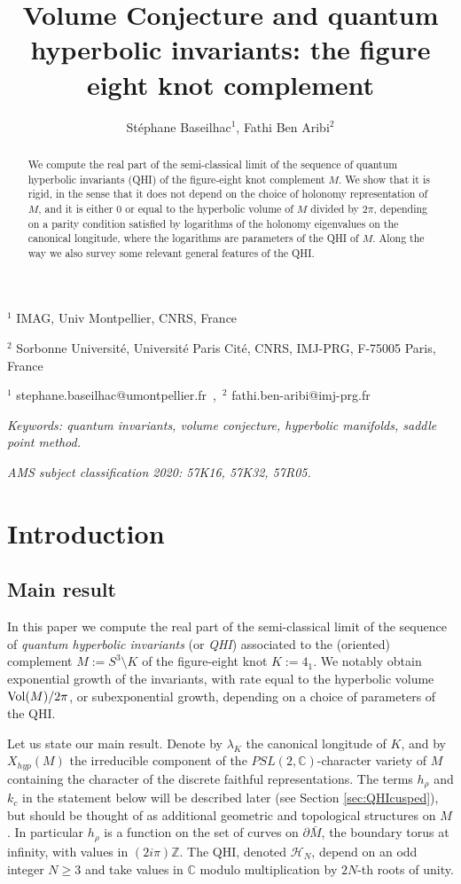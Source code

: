 \documentclass[11pt]{amsart}
\title[Volume Conjecture and quantum hyperbolic invariants]
{Volume Conjecture and quantum hyperbolic invariants: the figure eight knot complement}
\author{St\'ephane Baseilhac$^1$, Fathi Ben Aribi$^{2}$}
\newcommand{\mc}{\mathbb{C}}
\newcommand{\mz}{\mathbb{Z}}
\newcommand{\Hh}{{\mathcal H}}
\begin{document}
\maketitle

\centerline{${}^1$ IMAG, Univ Montpellier, CNRS, France}
\centerline{${}^2$ Sorbonne Université, Université Paris Cité, CNRS, IMJ-PRG, F-75005 Paris, France}
\medskip \centerline{${}^1$ stephane.baseilhac@umontpellier.fr\ ,\ ${}^2$ fathi.ben-aribi@imj-prg.fr}


\begin{abstract} We compute the real part of the semi-classical limit of the sequence of quantum hyperbolic invariants (QHI) of the figure-eight knot complement $M$. We show that  it is rigid, in the sense that it does not depend on the choice of holonomy representation of $M$, and it is either $0$ or equal to the hyperbolic volume of $M$ divided by $2\pi$, depending on a parity condition satisfied by logarithms of the holonomy eigenvalues on the canonical longitude, where the logarithms are parameters of the QHI of $M$. Along the way we also survey some relevant general features of the QHI.
\end{abstract}
\bigskip

{\it Keywords: quantum invariants, volume conjecture, hyperbolic manifolds, saddle point method.}

{\it AMS subject classification 2020: 57K16, 57K32, 57R05.} 

\tableofcontents

\section{Introduction}

\subsection{Main result}\label{QHIintro1} In this paper we compute the real part of the semi-classical limit of the sequence of {\it quantum hyperbolic invariants} (or \textit{QHI}) associated to the (oriented) complement $M:=S^3 \setminus K$ of the figure-eight knot $K:=4_1$. We notably obtain exponential growth of the invariants, with rate equal to the hyperbolic volume ${\rm Vol}(M)/2\pi$, or subexponential growth, depending on a choice of parameters of the QHI.  \smallskip

Let us state our main result. Denote by $\lambda_K$ the canonical longitude of $K$, and by $X_{hyp}(M)$ the  irreducible component of the $PSL(2,\mc)$-character variety of $M$ containing the character of the discrete faithful representations. The terms $h_\rho$ and $k_c$ in the statement below will be described later (see Section \ref{sec:QHIcusped}), but should be thought of as additional geometric and topological structures on $M$. In particular $h_\rho$ is a function on the set of curves on $\partial \bar{M}$, the boundary torus at infinity, with values in $(2 i \pi)\mz$. The QHI, denoted $\Hh_{N}$, depend on an odd integer $N\geq 3$ and take values in $\mc$ modulo multiplication by $2N$-th roots of unity.
\end{document}
